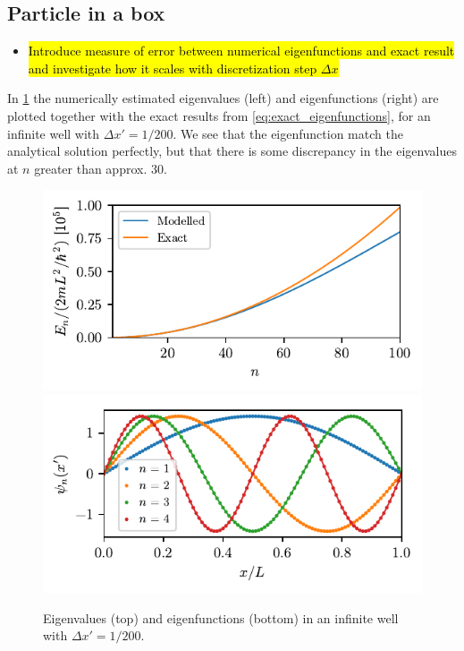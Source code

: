 \subsection*{Particle in a box}
\begin{itemize}
    \item \hl{Introduce measure of error between numerical eigenfunctions and exact result and investigate how it scales with discretization step $\Delta x$}
\end{itemize}

In \cref{fig:box_solutions} the numerically estimated eigenvalues (left) and eigenfunctions (right) are plotted together with the exact results from \cref{eq:exact_eigenfunctions}, for an infinite well with $\Delta x' = 1/200$. We see that the eigenfunction match the analytical solution perfectly, but that there is some discrepancy in the eigenvalues at $n$ greater than approx. 30.

\begin{figure}[ht!]%
\centering%
\includegraphics{figs/box_eigenvalues.pdf}\\%
\includegraphics{figs/box_eigenvectors.pdf}%
\caption{Eigenvalues (top) and eigenfunctions (bottom) in an infinite well with $\Delta x' = 1/200$. \label{fig:box_solutions}}%
\end{figure}

